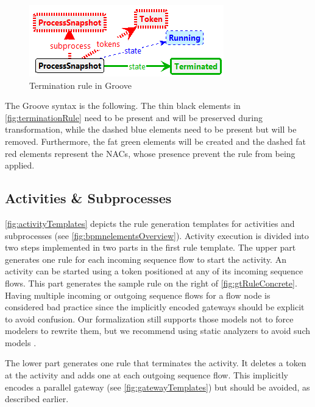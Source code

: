 \documentclass[runningheads]{llncs}
\begin{document}
\begin{figure}[ht]
    \centering
    \includegraphics[width=.6\textwidth]{images/terminate_groove.png}
    \caption{Termination rule in Groove}
    \label{fig:terminationRule}
\end{figure}

The Groove syntax is the following.
The thin black elements in \autoref{fig:terminationRule} need to be present and will be preserved during transformation, while the dashed blue elements need to be present but will be removed.
Furthermore, the fat green elements will be created and the dashed fat red elements represent the NACs, whose presence prevent the rule from being applied.

\subsection{Activities \& Subprocesses}

\autoref{fig:activityTemplates} depicts the rule generation templates for activities and subprocesses (see \autoref{fig:bpmnelementsOverview}).
Activity execution is divided into two steps implemented in two parts in the first rule template.
The upper part generates one rule for each incoming sequence flow to start the activity.
An activity can be started using a token positioned at any of its incoming sequence flows.
This part generates the sample rule on the right of \autoref{fig:gtRuleConcrete}.
Having multiple incoming or outgoing sequence flows for a flow node is considered bad practice since the implicitly encoded gateways should be explicit to avoid confusion.
Our formalization still supports those models not to force modelers to rewrite them, but we recommend using static analyzers to avoid such models \cite{camundaservicesgmbhBpmnlint2023}.

The lower part generates one rule that terminates the activity.
It deletes a token at the activity and adds one at each outgoing sequence flow.
This implicitly encodes a parallel gateway (see \autoref{fig:gatewayTemplates}) but should be avoided, as described earlier. 
\end{document}
